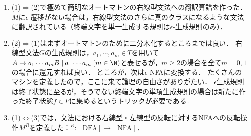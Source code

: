 \begin{remarks}[３つの同型対応]\mbox{}
    \begin{enumerate}
        \item (1)$\Rightarrow$(2)で極めて簡明なオートマトンの右線型文法への翻訳算譜を作った．
        $M$に$\epsilon$-遷移がない場合は，右線型文法のさらに真のクラスになるような文法に翻訳されている（終端文字を単一生成する規則は$\epsilon$-生成規則のみ）．
        \item (2)$\Rightarrow$(1)はまずオートマトンのために二分木化するところまでは良い．
        右線型文法$G$の生成規則は，$a_1,\cdots,a_m\in T$を用いて$A\to a_1\cdots a_mB\mid a_1\cdots a_m\;(m\in\N)$と表せるが，$m\ge 2$の場合を全て$m=0,1$の場合に還元すれば良い．
        ところが，次は$\epsilon$-NFAに変換する．
        たくさんのマシンを定義したので，ここに来て論理の自由さがありがたい．
        $\epsilon$生成規則は終了状態に至るが，そうでない終端文字の単項生成規則の場合は新たに作った終了状態$f\in F$に集めるというトリックが必要である．
        \item (1)$\Leftrightarrow$(3)では，文法における右線型・左線型の反転に対するNFAへの反転操作$M^R$を定義した：${}^R:[\mathrm{DFA}]\to[\mathrm{NFA}]$．
    \end{enumerate}
\end{remarks}

